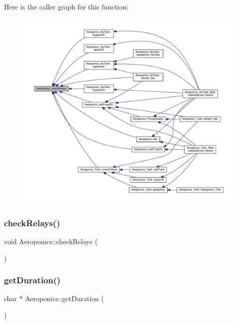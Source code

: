 Here is the caller graph for this function\+:
\nopagebreak
\begin{figure}[H]
\begin{center}
\leavevmode
\includegraphics[width=350pt]{class_aeroponics_a0f70505e6b8722985f6ab52f17595cdd_icgraph}
\end{center}
\end{figure}
\mbox{\label{class_aeroponics_a0f70505e6b8722985f6ab52f17595cdd}} 
\subsubsection{\texorpdfstring{check\+Relays()}{checkRelays()}\hspace{0.1cm}{\footnotesize\ttfamily [2/2]}}
{\footnotesize\ttfamily void Aeroponics\+::check\+Relays (\begin{DoxyParamCaption}{ }\end{DoxyParamCaption})\hspace{0.3cm}{\ttfamily [protected]}}

\mbox{\label{class_aeroponics_acd7c1402fad8a71c4f0ee4b15f27497d}} 
\subsubsection{\texorpdfstring{get\+Duration()}{getDuration()}\hspace{0.1cm}{\footnotesize\ttfamily [1/2]}}
{\footnotesize\ttfamily char $\ast$ Aeroponics\+::get\+Duration (\begin{DoxyParamCaption}{ }\end{DoxyParamCaption})}



